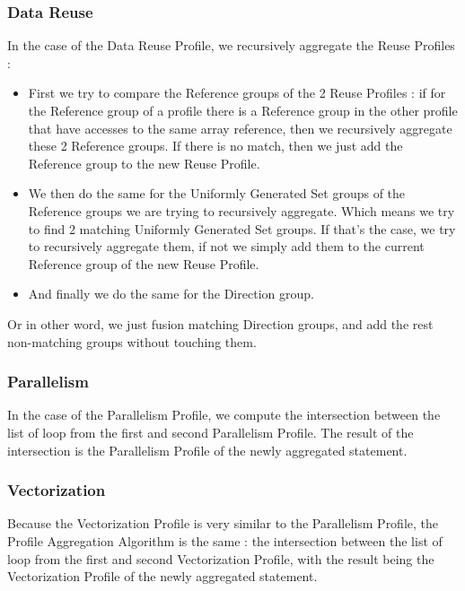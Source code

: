 \documentclass[paper=a4, fontsize=11pt]{scrartcl}
\numberwithin{equation}{section}        %
\numberwithin{figure}{section}          %
\numberwithin{table}{section}               %
\begin{document}
        \subsubsection{Data Reuse}
            In the case of the Data Reuse Profile, we recursively aggregate the Reuse Profiles :
            \begin{itemize}
                \item First we try to compare the Reference groups of the 2 Reuse Profiles :
                    if for the Reference group of a profile there is a Reference group in
                    the other profile that have accesses to the same array reference, then
                    we recursively aggregate these 2 Reference groups. If there is no
                    match, then we just add the Reference group to the new Reuse Profile.
                \item We then do the same for the Uniformly Generated Set groups of the
                    Reference groups we are trying to recursively aggregate. Which means we
                    try to find 2 matching Uniformly Generated Set groups.
                    If that's the case, we try to recursively aggregate them, if not we simply
                    add them to the current Reference group of the new Reuse Profile.
                \item And finally we do the same for the Direction group.
            \end{itemize}
            
            Or in other word, we just fusion matching Direction groups,
            and add the rest non-matching groups without touching them.
        \subsubsection{Parallelism}
            In the case of the Parallelism Profile, we compute the intersection between
            the list of loop from the first and second Parallelism Profile. The result
            of the intersection is the Parallelism Profile of the newly aggregated statement.
        \subsubsection{Vectorization}
            Because the Vectorization Profile is very similar to the Parallelism Profile, 
            the Profile Aggregation Algorithm is the same : the intersection between the
            list of loop from the first and second Vectorization Profile, with the result
            being the Vectorization Profile of the newly aggregated statement.
\end{document}
